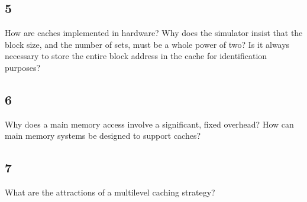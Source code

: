 \documentclass[letterpaper, 12pt, oneside]{memoir}
\begin{document}
\subsection{5}
How are caches implemented in hardware? Why does the simulator insist that the
block size, and the number of sets, must be a whole power of two? Is it always
necessary to store the entire block address in the cache for identification purposes?


\subsection{6}
Why does a main memory access involve a significant, fixed overhead? How can 
main memory systems be designed to support caches?


\subsection{7}
What are the attractions of a multilevel caching strategy?
\end{document}

